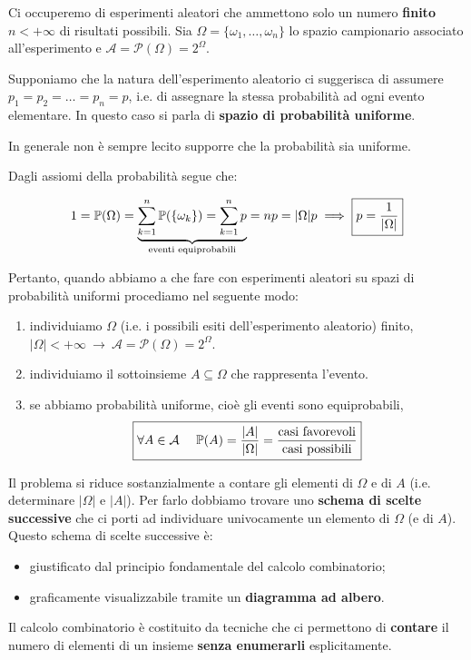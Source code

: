 
\ParteEsercizi

Ci occuperemo di esperimenti aleatori che ammettono solo un numero \textbf{finito} $n< +\infty $ di risultati possibili. Sia $\Omega =\{\omega _{1} ,\dots ,\omega _{n}\}$ lo spazio campionario associato all'esperimento e $\mathcal{A} =\mathcal{P}( \Omega ) =2^{\Omega }$.

Supponiamo che la natura dell'esperimento aleatorio ci suggerisca di assumere $p_{1} =p_{2} =\dots =p_{n} =p$, i.e. di assegnare la stessa probabilità ad ogni evento elementare. In questo caso si parla di \textbf{spazio di probabilità uniforme}.

\begin{oss}
	In generale non è sempre lecito supporre che la probabilità sia uniforme.
\end{oss}

Dagli assiomi della probabilità segue che:

\begin{equation*}
	1=\mathbb{P}( \Omega ) =\underbrace{\sum\limits _{k=1}^{n}\mathbb{P}(\{\omega _{k}\}) =\sum\limits _{k=1}^{n} p}_{\text{eventi equiprobabili}} =np=| \Omega | p\implies \boxed{p=\frac{1}{| \Omega | }}
\end{equation*}

Pertanto, quando abbiamo a che fare con esperimenti aleatori su spazi di probabilità uniformi procediamo nel seguente modo:
\begin{enumerate}
	\item individuiamo $\Omega $ (i.e. i possibili esiti dell'esperimento aleatorio) finito, $| \Omega | < +\infty \ \rightarrow \ \mathcal{A} =\mathcal{P}( \Omega ) =2^{\Omega }$.
	\item individuiamo il sottoinsieme $A\subseteq \Omega $ che rappresenta l'evento.
	\item se abbiamo probabilità uniforme, cioè gli eventi sono equiprobabili,
	\begin{equation*}
		\boxed{\forall A\in \mathcal{A} \ \ \ \ \mathbb{P}( A) =\frac{| A| }{| \Omega | } =\frac{\text{casi favorevoli}}{\text{casi possibili}}}
	\end{equation*}
\end{enumerate}
Il problema si riduce sostanzialmente a contare gli elementi di $\Omega $ e di $A$ (i.e. determinare $| \Omega | $ e $|A| $). Per farlo dobbiamo trovare uno \textbf{schema di scelte successive} che ci porti ad individuare univocamente un elemento di $\Omega $ (e di $A$). Questo schema di scelte successive è:
\begin{itemize}
	\item giustificato dal principio fondamentale del calcolo combinatorio;
	\item graficamente visualizzabile tramite un \textbf{diagramma ad albero}.
\end{itemize}
Il calcolo combinatorio è costituito da tecniche che ci permettono di \textbf{contare} il numero di elementi di un insieme \textbf{senza enumerarli} esplicitamente.

